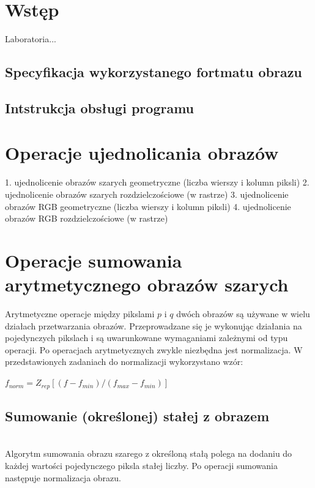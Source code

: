 \documentclass[final,a4paper,openany,12pt]{mwbk}
\begin{document}
\tableofcontents
\listoffigures

\sloppy


\chapter {Wstęp}

Laboratoria...~\cite{BookMok} %


\section {Specyfikacja wykorzystanego fortmatu obrazu}

\section {Intstrukcja obsługi programu}



\chapter{Operacje ujednolicania obrazów}
1. ujednolicenie obrazów szarych geometryczne (liczba wierszy i kolumn piksli)
2. ujednolicenie obrazów szarych rozdzielczościowe (w rastrze)
3. ujednolicenie obrazów RGB geometryczne (liczba wierszy i kolumn piksli)
4. ujednolicenie obrazów RGB rozdzielczościowe (w rastrze)

\chapter{Operacje sumowania arytmetycznego obrazów szarych}

Arytmetyczne operacje między pikslami $p$ i $q$ dwóch obrazów są używane w wielu działach przetwarzania obrazów. Przeprowadzane się je wykonując działania na pojedynczych pikslach i są uwarunkowane wymaganiami zależnymi od typu operacji. 
Po operacjach arytmetycznych zwykle niezbędna jest normalizacja. W przedstawionych zadaniach do normalizacji wykorzystano wzór:
	
	\begin{center}
		$ f_{norm} = Z_{rep}[(f - f_{min}) / (f_{max} - f_{min})] $
	\end{center}

\section {Sumowanie (określonej) stałej z obrazem}
\hfill\\
\indent
Algorytm sumowania obrazu szarego z określoną stałą polega na dodaniu do każdej wartości pojedynczego piksla stałej liczby.
Po operacji sumowania następuje normalizacja obrazu.
\end{document}

